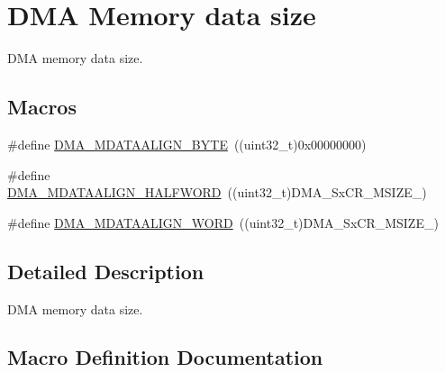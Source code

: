 \hypertarget{group___d_m_a___memory__data__size}{}\section{D\+MA Memory data size}
\label{group___d_m_a___memory__data__size}


D\+MA memory data size.  


\subsection*{Macros}
\begin{DoxyCompactItemize}
\item 
\#define \hyperlink{group___d_m_a___memory__data__size_ga9ed07bddf736298eba11508382ea4d51}{D\+M\+A\+\_\+\+M\+D\+A\+T\+A\+A\+L\+I\+G\+N\+\_\+\+B\+Y\+TE}~((uint32\+\_\+t)0x00000000)
\item 
\#define \hyperlink{group___d_m_a___memory__data__size_ga2c7355971c0da34a7ffe50ec87403071}{D\+M\+A\+\_\+\+M\+D\+A\+T\+A\+A\+L\+I\+G\+N\+\_\+\+H\+A\+L\+F\+W\+O\+RD}~((uint32\+\_\+t)D\+M\+A\+\_\+\+Sx\+C\+R\+\_\+\+M\+S\+I\+Z\+E\+\_)
\item 
\#define \hyperlink{group___d_m_a___memory__data__size_ga8812da819f18c873249074f3920220b2}{D\+M\+A\+\_\+\+M\+D\+A\+T\+A\+A\+L\+I\+G\+N\+\_\+\+W\+O\+RD}~((uint32\+\_\+t)D\+M\+A\+\_\+\+Sx\+C\+R\+\_\+\+M\+S\+I\+Z\+E\+\_)
\end{DoxyCompactItemize}


\subsection{Detailed Description}
D\+MA memory data size. 



\subsection{Macro Definition Documentation}
